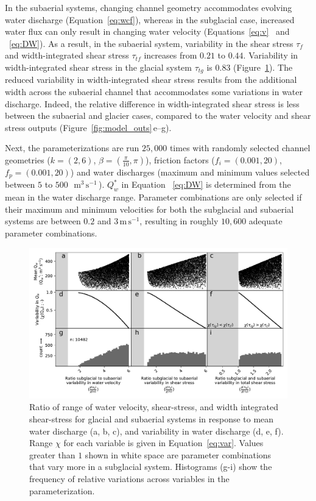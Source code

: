 \documentclass[11pt]{article}
\newcommand{\mmms}{$\,\mathrm{m^3\, s^{-1}}$\,}
\newcommand{\unit}[1]{$\mathrm{#1}$}
\begin{document}
\begin{spacing}{1}
  In the subaerial systems, changing channel geometry accommodates evolving water discharge  (Equation~\ref{eq:wcf}), whereas in the subglacial case, increased water flux can only result in changing water velocity (Equations~\ref{eq:v}~ and ~\ref{eq:DW}).
  As a result, in the subaerial system, variability in the shear stress $\tau_f$ and width-integrated shear stress $\tau_{tf}$ increases from $0.21$ to $0.44$. Variability in width-integrated shear stress  in the glacial system $\tau_{tg}$ is $0.83$ (Figure~\ref{fig:range}).
  The reduced variability in width-integrated shear stress results from the additional width across the subaerial channel that accommodates some variations in water discharge.
  Indeed, the relative  difference in width-integrated shear stress is less between the subaerial and glacier cases, compared to the water velocity and shear stress outputs (Figure~\ref{fig:model_outs}\,e--g).

  
  Next, the parameterizations are run $25,000$ times with randomly selected channel geometries ($k=(2,6)$, $\beta=(\frac{\pi}{10},\pi)$), friction factors ($f_i=(0.001,20)$, $f_p=(0.001,20)$) and water discharges (maximum and minimum values selected between $5$ to $500$ \,\mmms). $Q_w^*$ in Equation ~\ref{eq:DW} is determined from the mean in the water discharge range. Parameter combinations are only selected if their maximum and minimum velocities for both the subglacial and subaerial systems are between $0.2$ and $3$\,\unit{m}\,\unit{s}$^{-1}$, resulting in roughly $10,600$ adequate parameter combinations. 
  
  
  \begin{center}
    \begin{figure}[H]
      \includegraphics[width=0.7\linewidth]{multi_run.pdf}
      \caption{Ratio of range of water velocity, shear-stress, and width integrated shear-stress for glacial and subaerial systems in response to mean water discharge (a, b, c), and  variability in water discharge (d, e, f).  
        Range  $\chi$ for each variable is given in Equation~\ref{eq:var}. Values greater than $1$ shown in white space are parameter combinations that vary more in a subglacial  system.
        Histograms (g-i) show the frequency of relative variations across variables in the parameterization.}
      \label{fig:range}
    \end{figure}
  \end{center}
  

\end{spacing}
\end{document}
